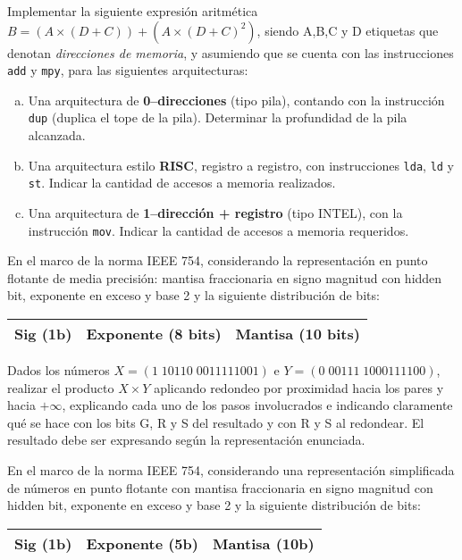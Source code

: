 \documentclass[12pt,a4paper]{article}
\begin{document}

Implementar la siguiente expresión aritmética $B = (A \times (D + C))  + (A \times (D + C)^2)$, siendo A,B,C y D etiquetas que denotan \textit{direcciones de memoria}, y asumiendo que se cuenta con las instrucciones \texttt{add} y \texttt{mpy}, para las siguientes arquitecturas:
\begin{enumerate}[a)]
	\item Una arquitectura de \textbf{0--direcciones} (tipo pila), contando con la instrucción \texttt{dup} (duplica el tope de la pila). Determinar la profundidad de la pila alcanzada. 
	
	\item Una arquitectura estilo \textbf{RISC}, registro a registro, con instrucciones \texttt{lda}, \texttt{ld} y \texttt{st}. Indicar la cantidad de accesos a memoria realizados.
	
	\item Una arquitectura de \textbf{1--dirección + registro} (tipo INTEL), con la instrucción \texttt{mov}. Indicar la cantidad de accesos a memoria requeridos.	
\end{enumerate}

 En el marco de la norma IEEE 754, considerando la representación en punto flotante de media precisión: mantisa fraccionaria en signo magnitud con hidden bit, exponente en exceso y base 2 y la siguiente distribución de bits:
\begin{center}
	\begin{tabular}{|c|c|c|}\hline
		Sig (1b) & Exponente (8 bits) & Mantisa (10 bits)\\\hline
	\end{tabular}
\end{center}

Dados los números $X = (1\; 10110\; 0011111001)$ e $Y = (0\; 00111\; 1000111100)$, realizar el producto $X \times Y$ aplicando redondeo por proximidad hacia los pares y hacia $+\infty$, explicando cada uno de los pasos involucrados e indicando claramente qué se hace con los bits G, R y S del resultado y con R y S al redondear. El resultado debe ser expresando según la representación enunciada.

 En el marco de la norma IEEE 754, considerando una representación simplificada de números en punto flotante con mantisa fraccionaria en signo magnitud con hidden bit, exponente en exceso y base 2 y la siguiente distribución de bits:\begin{center}
	\begin{tabular}{|c|c|c|} \hline Sig (1b) & Exponente (5b) & Mantisa (10b) \\\hline\end{tabular}
\end{center}
\end{document}
